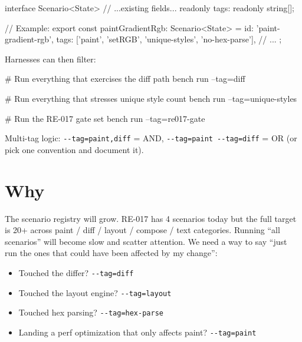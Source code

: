 \begin{CodeBlock}
interface Scenario<State> {
  // ...existing fields...
  readonly tags: readonly string[];
}

// Example:
export const paintGradientRgb: Scenario<State> = {
  id: 'paint-gradient-rgb',
  tags: ['paint', 'setRGB', 'unique-styles', 'no-hex-parse'],
  // ...
};
\end{CodeBlock}

Harnesses can then filter:

\begin{CodeBlock}
# Run everything that exercises the diff path
bench run --tag=diff

# Run everything that stresses unique style count
bench run --tag=unique-styles

# Run the RE-017 gate set
bench run --tag=re017-gate
\end{CodeBlock}

Multi-tag logic: \texttt{-\allowbreak{}-\allowbreak{}t\allowbreak{}a\allowbreak{}g\allowbreak{}=\allowbreak{}p\allowbreak{}a\allowbreak{}i\allowbreak{}n\allowbreak{}t\allowbreak{},\allowbreak{}d\allowbreak{}i\allowbreak{}f\allowbreak{}f} = AND, \texttt{-\allowbreak{}-\allowbreak{}t\allowbreak{}a\allowbreak{}g\allowbreak{}=\allowbreak{}p\allowbreak{}a\allowbreak{}i\allowbreak{}n\allowbreak{}t\allowbreak{} \allowbreak{}-\allowbreak{}-\allowbreak{}t\allowbreak{}a\allowbreak{}g\allowbreak{}=\allowbreak{}d\allowbreak{}i\allowbreak{}f\allowbreak{}f} = OR (or pick one convention and document it).

\section{Why}\label{record-323-why}

The scenario registry will grow. RE-017 has 4 scenarios today but the full target is 20+ across paint / diff / layout / compose / text categories. Running ``all scenarios'' will become slow and scatter attention. We need a way to say ``just run the ones that could have been affected by my change'':

\begin{itemize}
\tightlist
\item
  Touched the differ? \texttt{-\allowbreak{}-\allowbreak{}t\allowbreak{}a\allowbreak{}g\allowbreak{}=\allowbreak{}d\allowbreak{}i\allowbreak{}f\allowbreak{}f}
\item
  Touched the layout engine? \texttt{-\allowbreak{}-\allowbreak{}t\allowbreak{}a\allowbreak{}g\allowbreak{}=\allowbreak{}l\allowbreak{}a\allowbreak{}y\allowbreak{}o\allowbreak{}u\allowbreak{}t}
\item
  Touched hex parsing? \texttt{-\allowbreak{}-\allowbreak{}t\allowbreak{}a\allowbreak{}g\allowbreak{}=\allowbreak{}h\allowbreak{}e\allowbreak{}x\allowbreak{}-\allowbreak{}p\allowbreak{}a\allowbreak{}r\allowbreak{}s\allowbreak{}e}
\item
  Landing a perf optimization that only affects paint? \texttt{-\allowbreak{}-\allowbreak{}t\allowbreak{}a\allowbreak{}g\allowbreak{}=\allowbreak{}p\allowbreak{}a\allowbreak{}i\allowbreak{}n\allowbreak{}t}
\end{itemize}

